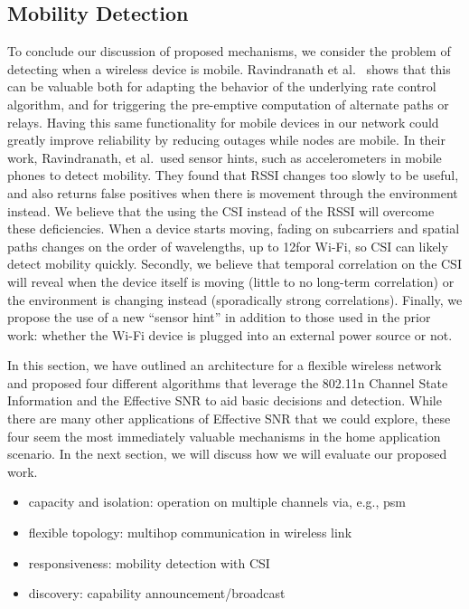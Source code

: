 \subsection{Mobility Detection}
To conclude our discussion of proposed mechanisms, we consider the problem of detecting when a wireless device is mobile. Ravindranath et al.~\cite{ravindranath_sensorhints} shows that this can be valuable both for adapting the behavior of the underlying rate control algorithm, and for triggering the pre-emptive computation of alternate paths or relays. Having this same functionality for mobile devices in our network could greatly improve reliability by reducing outages while nodes are mobile. In their work, Ravindranath, et al.\ used sensor hints, such as accelerometers in mobile phones to detect mobility. They found that RSSI changes too slowly to be useful, and also returns false positives when there is movement through the environment instead. We believe that the using the CSI instead of the RSSI will overcome these deficiencies. When a device starts moving, fading on subcarriers and spatial paths changes on the order of wavelengths, up to 12\cm for Wi-Fi, so CSI can likely detect mobility quickly. Secondly, we believe that temporal correlation on the CSI will reveal when the device itself is moving (little to no long-term correlation) or the environment is changing instead (sporadically strong correlations). Finally, we propose the use of a new ``sensor hint'' in addition to those used in the prior work: whether the Wi-Fi device is plugged into an external power source or not.

 In this section, we have outlined an architecture for a flexible wireless network and proposed four different algorithms that leverage the 802.11n Channel State Information and the Effective SNR to aid basic decisions and detection. While there are many other applications of Effective SNR that we could explore, these four seem the most immediately valuable mechanisms in the home application scenario. In the next section, we will discuss how we will evaluate our proposed work.

\begin{itemize}
\item capacity and isolation: operation on multiple channels via, e.g., psm
\item flexible topology: multihop communication in wireless link
\item responsiveness: mobility detection with CSI
\item discovery: capability announcement/broadcast
\end{itemize}

